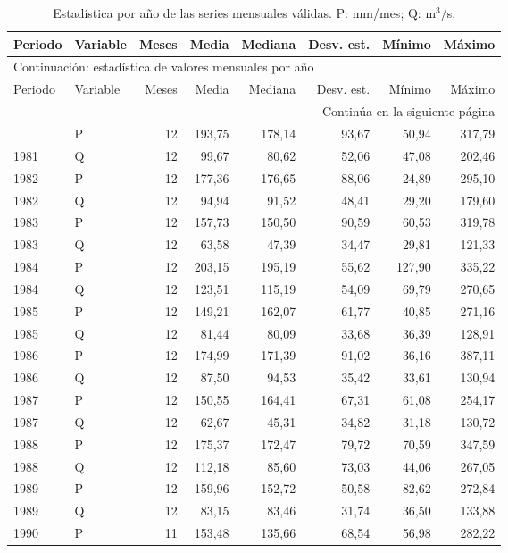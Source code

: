\documentclass[10pt,a4paper]{article}
\begin{document}
\begingroup\small
\begin{longtable}{llrrrrrr}
\caption{Estadística por año de las series mensuales válidas. P: mm/mes; Q: m$^3$/s.}\\
\hline
Periodo & Variable & Meses & Media & Mediana & Desv. est. & Mínimo & Máximo \\
\hline\endfirsthead
\multicolumn{8}{l}{Continuación: estadística de valores mensuales por año}\\
\hline
Periodo & Variable & Meses & Media & Mediana & Desv. est. & Mínimo & Máximo \\
\hline\endhead
\hline\multicolumn{8}{r}{Continúa en la siguiente página}\\\endfoot
\hline\endlastfoot
1981 & P & 12 & 193,75 & 178,14 & 93,67 & 50,94 & 317,79 \\
1981 & Q & 12 & 99,67 & 80,62 & 52,06 & 47,08 & 202,46 \\
1982 & P & 12 & 177,36 & 176,65 & 88,06 & 24,89 & 295,10 \\
1982 & Q & 12 & 94,94 & 91,52 & 48,41 & 29,20 & 179,60 \\
1983 & P & 12 & 157,73 & 150,50 & 90,59 & 60,53 & 319,78 \\
1983 & Q & 12 & 63,58 & 47,39 & 34,47 & 29,81 & 121,33 \\
1984 & P & 12 & 203,15 & 195,19 & 55,62 & 127,90 & 335,22 \\
1984 & Q & 12 & 123,51 & 115,19 & 54,09 & 69,79 & 270,65 \\
1985 & P & 12 & 149,21 & 162,07 & 61,77 & 40,85 & 271,16 \\
1985 & Q & 12 & 81,44 & 80,09 & 33,68 & 36,39 & 128,91 \\
1986 & P & 12 & 174,99 & 171,39 & 91,02 & 36,16 & 387,11 \\
1986 & Q & 12 & 87,50 & 94,53 & 35,42 & 33,61 & 130,94 \\
1987 & P & 12 & 150,55 & 164,41 & 67,31 & 61,08 & 254,17 \\
1987 & Q & 12 & 62,67 & 45,31 & 34,82 & 31,18 & 130,72 \\
1988 & P & 12 & 175,37 & 172,47 & 79,72 & 70,59 & 347,59 \\
1988 & Q & 12 & 112,18 & 85,60 & 73,03 & 44,06 & 267,05 \\
1989 & P & 12 & 159,96 & 152,72 & 50,58 & 82,62 & 272,84 \\
1989 & Q & 12 & 83,15 & 83,46 & 31,74 & 36,50 & 133,88 \\
1990 & P & 11 & 153,48 & 135,66 & 68,54 & 56,98 & 282,22 \\

\end{longtable}
\end{document}
